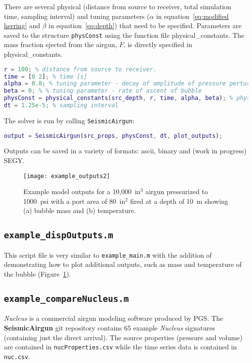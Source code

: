\documentclass[10pt]{article}
\begin{document}
There are several physical (distance from source to receiver, total simulation time, sampling interval) and tuning parameters ($\alpha$ in equation~\ref{eq:modified herring} and $\beta$ in equation~\ref{eq:depth}) that need to be specified. Parameters are saved to the structure \texttt{physConst} using the function file {physical\_constants}. The mass fraction ejected from the airgun, $F$, is directly specified in {physical\_constants}.
\begin{lstlisting}[language=Matlab]
% Physical and Tuning Parameters
r = 100; % distance from source to receiver. 
time = [0 2]; % time [s]
alpha = 0.8; % tuning parameter - decay of amplitude of pressure perturbation
beta = 0; % % tuning parameter - rate of ascent of bubble
physConst = physical_constants(src_depth, r, time, alpha, beta); % physical constant
dt = 1.25e-5; % sampling interval
\end{lstlisting}

The solver is run by calling \texttt{SeismicAirgun}:
\begin{lstlisting}[language=Matlab]
output = SeismicAirgun(src_props, physConst, dt, plot_outputs); 
\end{lstlisting}
Outputs can be saved in a variety of formats: ascii, binary and (work in progress) SEGY.

\begin{figure}[b!]
\centering
\texttt{[image: example\_outputs2]}
\caption{Example model outputs for a 10,000~in$^3$ airgun pressurized to 1000~psi with a port area of 80~in$^2$ fired at a depth of 10~m showing (a) bubble mass and (b) temperature.}
\label{fig:example outputs2}
\end{figure}

\subsection{\texttt{example\_dispOutputs.m}}
This script file is very similar to \texttt{example\_main.m} with the addition of demonstrating how to plot additional outputs, such as mass and temperature of the bubble (Figure~\ref{fig:example outputs2}).

\subsection{\texttt{example\_compareNucleus.m}}
\emph{Nucleus} is a commercial airgun modeling software produced by PGS. The {\bf SeismicAirgun} git repository contains 65 example \emph{Nucleus} signatures (containing just the direct arrival). The source properties (pressure and volume) are contained in \texttt{nucProperties.csv} while the time series data is contained in \texttt{nuc.csv}.
\end{document}
